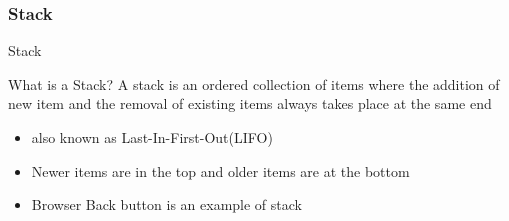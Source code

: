 \documentclass{beamer}
\begin{document}
\subsubsection{Stack}
\begin{frame}{Stack}
    \begin{alertblock}{What is a Stack?}
        A \alert{stack} is an ordered collection of items where the addition of new item and the removal of existing items always takes place at the same end 
    \end{alertblock}
    \begin{itemize}
        \item also known as \alert{Last-In-First-Out(LIFO)}
        \item Newer items are in the top and older items are at the bottom
        \item Browser \alert{Back} button is an example of stack
    \end{itemize}
\end{frame}
\end{document}
